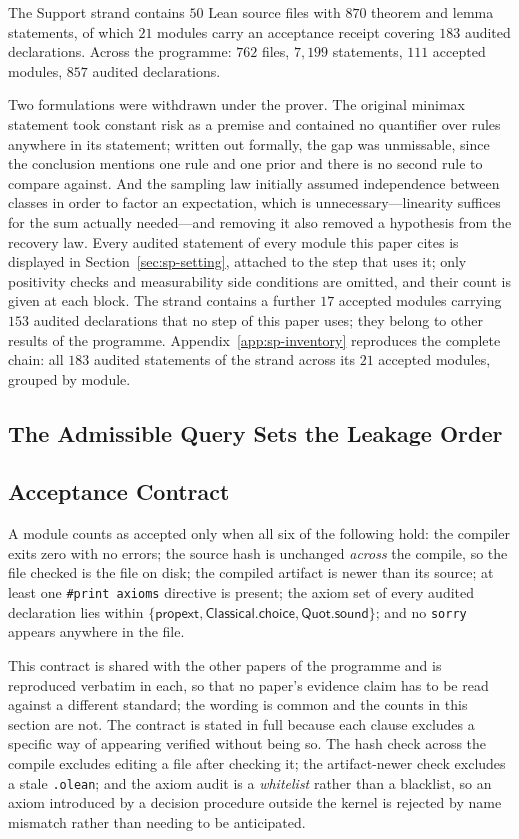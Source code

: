 \documentclass[conference]{IEEEtran}
\theoremstyle{definition}
\begin{document}
The Support strand contains $50$ Lean source files with $870$ theorem and lemma statements,
of which $21$ modules carry an acceptance receipt covering $183$ audited declarations. Across
the programme: $762$ files, $7{,}199$ statements, $111$ accepted modules, $857$ audited
declarations.

Two formulations were withdrawn under the prover. The original minimax statement took constant
risk as a premise and contained no quantifier over rules anywhere in its statement; written out
formally, the gap was unmissable, since the conclusion mentions one rule and one prior and
there is no second rule to compare against. And the sampling law initially assumed independence
between classes in order to factor an expectation, which is unnecessary---linearity suffices
for the sum actually needed---and removing it also removed a hypothesis from the recovery law.
Every audited statement of every module this paper cites is displayed in Section~\ref{sec:sp-setting}, attached to the step that uses it; only positivity checks and measurability side conditions are omitted, and their count is given at each block. The strand contains a further $17$ accepted modules carrying $153$ audited declarations that no step of this paper uses; they belong to other results of the programme. Appendix~\ref{app:sp-inventory} reproduces the complete chain: all $183$ audited statements of the strand across its $21$ accepted modules, grouped by module.


\subsection{The Admissible Query Sets the Leakage Order}
\label{sec:qy-verification}

\subsection{Acceptance Contract}

A module counts as accepted only when all six of the following hold: the compiler exits zero
with no errors; the source hash is unchanged \emph{across} the compile, so the file checked is
the file on disk; the compiled artifact is newer than its source; at least one
\texttt{\#print axioms} directive is present; the axiom set of every audited declaration lies
within $\{\textsf{propext},\textsf{Classical.choice},\textsf{Quot.sound}\}$; and no
\texttt{sorry} appears anywhere in the file.

This contract is shared with the other papers of the programme and is reproduced verbatim in
each, so that no paper's evidence claim has to be read against a different standard; the
wording is common and the counts in this section are not. The contract is stated in full
because each clause excludes a specific way of appearing verified without being so. The hash check across the compile excludes editing a file after
checking it; the artifact-newer check excludes a stale \texttt{.olean}; and the axiom audit is
a \emph{whitelist} rather than a blacklist, so an axiom introduced by a decision procedure
outside the kernel is rejected by name mismatch rather than needing to be anticipated.
\end{document}
